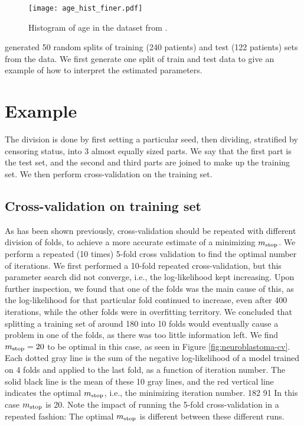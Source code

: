 \begin{figure}\label{fig:age-hist}
\caption{Histogram of age in the dataset from \citet{oberthuer-data}.}
\centering\texttt{[image: age\_hist\_finer.pdf]}
\end{figure}

\citet{bovelstad2009} generated 50 random splits of training (240 patients) and test (122 patients) sets from the data.
We first generate one split of train and test data to give an example of how to interpret the estimated parameters.

\section{Example}
The division is done by first setting a particular seed, then dividing, stratified by censoring status, into 3 almost equally sized parts.
We say that the first part is the test set, and the second and third parts are joined to make up the training set.
We then perform cross-validation on the training set.

\subsection{Cross-validation on training set}
As has been shown previously, cross-validation should be repeated with different division of folds, to achieve a more accurate estimate of a minimizing $m_{\text{stop}}$.
We perform a repeated (10 times) 5-fold cross validation to find the optimal number of iterations.
We first performed a 10-fold repeated cross-validation, but this parameter search did not converge, i.e., the log-likelihood kept increasing.
Upon further inspection, we found that one of the folds was the main cause of this, as the log-likelihood for that particular fold continued to increase, even after 400 iterations, while the other folds were in overfitting territory.
We concluded that splitting a training set of around 180 into 10 folds would eventually cause a problem in one of the folds, as there was too little information left.
We find $m_{\text{stop}}=20$ to be optimal in this case, as seen in Figure \ref{fig:neuroblastoma-cv}.
Each dotted gray line is the sum of the negative log-likelihood of a model trained on 4 folds and applied to the last fold, as a function of iteration number.
The solid black line is the mean of these 10 gray lines, and the red vertical line indicates the optimal $m_{\text{stop}}$, i.e., the minimizing iteration number.
182 91
In this case $m_{\text{stop}}$ is 20.
Note the impact of running the 5-fold cross-validation in a repeated fashion:
The optimal $m_{\text{stop}}$ is different between these different runs.

